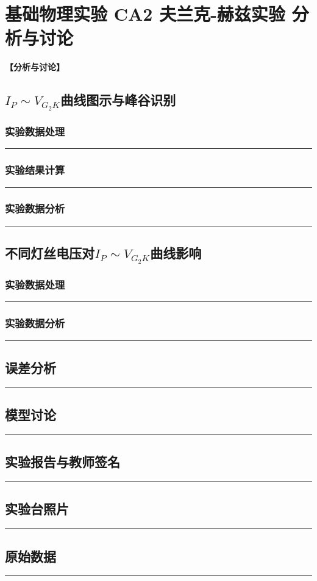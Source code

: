 \documentclass[dvipsnames, svgnames,a4paper,11pt]{article}
\newcommand{\recordblank}[1]{%
  \par\noindent\rule{0.95\linewidth}{0pt}\rule{0pt}{#1}\par}
\begin{document}
\section{基础物理实验  \quad CA2 夫兰克-赫兹实验 \heiti 分析与讨论}
\textbf{【分析与讨论】}
\subsection{$I_P\sim V_{G_2K}$曲线图示与峰谷识别}
\subsubsection{实验数据处理}
\recordblank{3.2cm}
\subsubsection{实验结果计算}
\recordblank{3.2cm}
\subsubsection{实验数据分析}
\recordblank{3.2cm}
\subsection{不同灯丝电压对$I_P\sim V_{G_2K}$曲线影响}
\subsubsection{实验数据处理}
\recordblank{3.2cm}
\subsubsection{实验数据分析}
\recordblank{3.2cm}
\subsection{误差分析}
\recordblank{3.2cm}
\subsection{模型讨论}
\recordblank{3.2cm}
\clearpage
\appendix
\appendixpage
\addappheadtotoc
\subsection{实验报告与教师签名}
\recordblank{5.5cm}
\subsection{实验台照片}
\recordblank{5.5cm}
\subsection{原始数据}
\recordblank{12cm}
\end{document}
